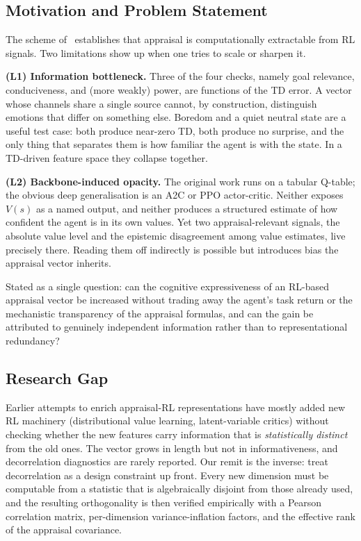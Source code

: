 \documentclass[conference]{IEEEtran}
\begin{document}
\subsection{Motivation and Problem Statement}
The scheme of~\cite{zhang2023modeling} establishes that appraisal is
computationally extractable from RL signals. Two limitations show up
when one tries to scale or sharpen it.

\textbf{(L1) Information bottleneck.} Three of the four checks, namely
goal relevance, conduciveness, and (more weakly) power, are functions of the
TD error. A vector whose channels share a single source cannot, by
construction, distinguish emotions that differ on something else.
Boredom and a quiet neutral state are a useful test case: both produce
near-zero TD, both produce no surprise, and the only thing that
separates them is how familiar the agent is with the state. In a
TD-driven feature space they collapse together.

\textbf{(L2) Backbone-induced opacity.} The original work runs on a
tabular Q-table; the obvious deep generalisation is an A2C or PPO
actor-critic. Neither exposes $V(s)$ as a named output, and neither
produces a structured estimate of how confident the agent is in its own
values. Yet two appraisal-relevant signals, the absolute value level
and the epistemic disagreement among value estimates, live precisely
there. Reading them off indirectly is possible but introduces bias the
appraisal vector inherits.

Stated as a single question: can the cognitive expressiveness of an
RL-based appraisal vector be increased without trading away the agent's
task return or the mechanistic transparency of the appraisal formulas,
and can the gain be attributed to genuinely independent information
rather than to representational redundancy?

\subsection{Research Gap}
Earlier attempts to enrich appraisal-RL representations have mostly added
new RL machinery (distributional value learning, latent-variable
critics) without checking whether the new features carry information
that is \emph{statistically distinct} from the old ones. The vector
grows in length but not in informativeness, and decorrelation
diagnostics are rarely reported. Our remit is the inverse: treat
decorrelation as a design constraint up front. Every new dimension must
be computable from a statistic that is algebraically disjoint from those
already used, and the resulting orthogonality is then verified
empirically with a Pearson correlation matrix, per-dimension
variance-inflation factors, and the effective rank of the appraisal
covariance.
\end{document}
